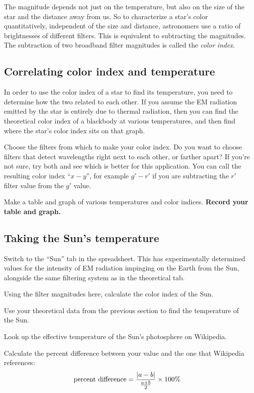 The magnitude depends not just on the temperature, but also on the size of the star and the distance away from us. So to characterize a star's color quantitatively, independent of the size and distance, astronomers use a ratio of brightnesses of different filters. This is equivalent to subtracting the magnitudes. The subtraction of two broadband filter magnitudes is called the \textit{color index}.

\subsection{Correlating color index and temperature}

In order to use the color index of a star to find its temperature, you need to determine how the two related to each other. If you assume the EM radiation emitted by the star is entirely due to thermal radiation, then you can find the theoretical color index of a blackbody at various temperatures, and then find where the star's color index sits on that graph.

\begin{steps}
	\item Choose the filters from which to make your color index. Do you want to choose filters that detect wavelengths right next to each other, or farther apart? If you're not sure, try both and see which is better for this application. You can call the resulting color index ``$x - y$'', for example $g' - r'$ if you are subtracting the $r'$ filter value from the $g'$ value.
	
	\item Make a table and graph of various temperatures and color indices. \textbf{Record your table and graph.}
\end{steps}

\subsection{Taking the Sun's temperature}

\begin{steps}
	\item Switch to the ``Sun'' tab in the spreadsheet. This has experimentally determined values for the intensity of EM radiation impinging on the Earth from the Sun, alongside the same filtering system as in the theoretical tab.
	
	\item Using the filter magnitudes here, calculate the color index of the Sun.
	
	\item Use your theoretical data from the previous section to find the temperature of the Sun.
	
	\item Look up the effective temperature of the Sun's photosphere on Wikipedia.
	
	\item Calculate the percent difference between your value and the one that Wikipedia references:
	\begin{equation}
	 \textrm{percent difference} = \frac{\left\lvert a-b\right\rvert}{\frac{a+b}{2}} \times 100\%
	\end{equation}
\end{steps}

